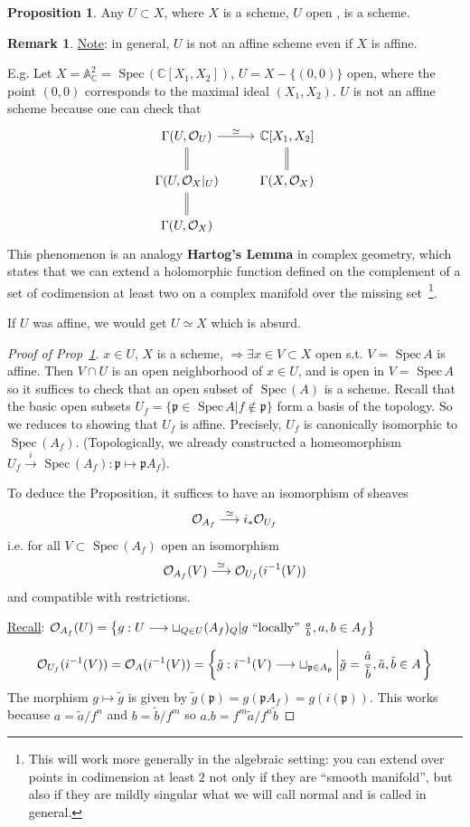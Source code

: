 \documentclass[11pt]{article}
\theoremstyle{definition}
\newtheorem{prop}[thm]{Proposition}
\newtheorem{rmk}[thm]{Remark}
\newcommand{\spec}{\text{ Spec}\,}
\newcommand{\affn}{\mathbb A}
\newcommand{\cplx}{\mathbb C}
\newcommand{\scp}{{\mathfrak p}}
\newcommand{\calo}{{\cal O}}
\newcommand{\Lrta}{\Longrightarrow}
\newcommand{\lrta}{\longrightarrow}
\begin{document}
\begin{prop}\label{prop:open_subscheme} Any $U\subset X$, where $X$ is a scheme, $U$ open , is a scheme. 
\end{prop}
\begin{rmk}
\underline{Note}: in general, $U$ is not an affine  scheme even if $X$ is affine.

E.g.
 Let $X=\affn^2_\cplx=\spec(\cplx[X_1,X_2])$, $U=X-\{(0,0)\}$ open, where the point $(0,0)$ corresponds to the maximal ideal $(X_1,X_2)$. $U$ is not  an affine scheme because one can check that 
$$
\begin{tikzcd}
\Gamma(U,\calo_U) \arrow[d, equal] \arrow[r, "\simeq"] & \cplx[X_1,X_2] \arrow[d,equal] \\
\Gamma(U,\calo_X|_U) \arrow[d,equal] & \Gamma(X,\calo_X) \\
\Gamma(U,\calo_X) & 
\end{tikzcd}
$$
This phenomenon is an analogy \textbf{Hartog's Lemma} in complex geometry, which states that we can extend a holomorphic function defined on the complement of a set of codimension at least two on a complex manifold over the missing set~\footnote{This will work more generally in the algebraic setting: you can extend over points in codimension at least $2$ not only if they are ``smooth manifold'', but also if they are mildly singular what we will call normal and is called  in general.}.

If $U$ was affine, we would get $U\simeq X$ which is absurd.
\end{rmk}
\begin{proof}[Proof of Prop~\ref{prop:open_subscheme}]
$x\in U$, $X$ is a scheme, $\Lrta \exists x\in V\subset X$ open s.t. $V=\spec A$ is affine. Then $V\cap U$ is an open neighborhood of $x\in U$, and is  open in $V=\spec A$ so it suffices to check that an open subset of $\spec(A)$ is a scheme. Recall that the basic open subsets $U_f=\{\scp\in \spec A|f\notin \scp\}$ form a basis of the topology. So we reduces to showing that  $U_f$ is affine. Precisely, $U_f$ is canonically isomorphic to $\spec(A_f)$. (Topologically, we already constructed a homeomorphism $U_f\overset{i}{\lrta} \spec(A_f): \scp\mapsto \scp A_f$).

To deduce the Proposition, it suffices to have an isomorphism of sheaves 
$$
\calo_{A_f}\overset{\simeq}{\lrta} i_*\calo_{U_f}
$$
i.e. for all $V\subset \spec (A_f)$ open an isomorphism 
$$
\calo_{A_f}(V)\overset{\simeq }{\lrta} \calo_{U_f}(i^{-1}(V))
$$
and compatible with restrictions.

\underline{Recall}: $\calo_{A_f}(U)=\left\{g:U\lrta \sqcup_{Q\in U}(A_f)_Q|g\text{ ``locally'' } \frac{a}{b}, a,b\in A_f\right\} $

$$
\calo_{U_f}(i^{-1}(V))=\calo_A(i^{-1}(V))=\left\{\tilde{g}: i^{-1}(V)\lrta \sqcup_{\scp \in A_{\scp}}\left|\tilde{g}=\frac{\tilde{a}}{\tilde{b}}, \tilde{a},\tilde{b}\in A\right.\right\}
$$
The morphism $g\mapsto \tilde{g}$ is given by $\tilde{g}(\scp)=g(\scp A_f)=g(i(\scp))$. This works because $a=\tilde{a}/f^n$ and $b=\tilde{b}/f^m$ so $a.b=f^m\tilde{a}/f^n\tilde{b}$
\end{proof}
\end{document}
